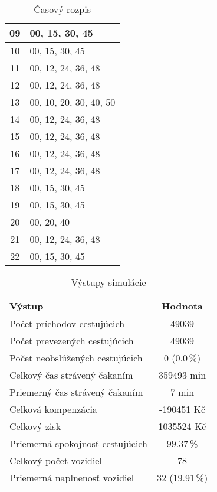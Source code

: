 \begin{table}[h]
\begin{minipage}{0.45\textwidth}
\begin{tabular}{|c|l|}
          09 & 00, 15, 30, 45 \\ \hline
          10 & 00, 15, 30, 45 \\ \hline
          11 & 00, 12, 24, 36, 48 \\ \hline
          12 & 00, 12, 24, 36, 48 \\ \hline
          13 & 00, 10, 20, 30, 40, 50 \\ \hline
          14 & 00, 12, 24, 36, 48 \\ \hline
          15 & 00, 12, 24, 36, 48 \\ \hline
          16 & 00, 12, 24, 36, 48 \\ \hline
          17 & 00, 12, 24, 36, 48 \\ \hline
          18 & 00, 15, 30, 45 \\ \hline
          19 & 00, 15, 30, 45 \\ \hline
          20 & 00, 20, 40 \\ \hline
          21 & 00, 12, 24, 36, 48 \\ \hline
          22 & 00, 15, 30, 45 \\ \hline
      \end{tabular}
      \caption{Časový rozpis}
      \end{minipage}
  \end{table}

  \begin{table}[h]
    \centering
    \begin{tabular}{|l|c|}
      \hline
        \textbf{Výstup} & \textbf{Hodnota} \\ \hline
          Počet príchodov cestujúcich & 49039 \\ \hline
          Počet prevezených cestujúcich & 49039 \\ \hline
          Počet neobslúžených cestujúcich & 0 (0.0\,\%) \\ \hline
          Celkový čas strávený čakaním & 359493 min \\ \hline
          Priemerný čas strávený čakaním & 7 min \\ \hline
          Celková kompenzácia & -190451 Kč \\ \hline
          Celkový zisk & 1035524 Kč \\ \hline
          Priemerná spokojnosť cestujúcich & 99.37\,\% \\ \hline
          Celkový počet vozidiel & 78 \\ \hline
          Priemerná naplnenosť vozidiel & 32 (19.91\,\%) \\ \hline
    \end{tabular}
    \caption{Výstupy simulácie}
  \end{table}

